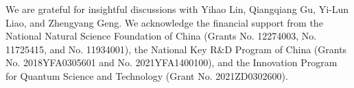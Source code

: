 \documentclass[%
reprint,
superscriptaddress,
bibnotes,
amsmath,amssymb,
aps,
floatfix, %
]{revtex4-2}
\begin{document}
\begin{acknowledgments}
\noindent We are grateful for insightful discussions with Yihao Lin, Qiangqiang Gu, Yi-Lun Liao, and Zhengyang Geng. We acknowledge the ﬁnancial support from the National Natural Science Foundation of China (Grants No. 12274003, No. 11725415, and No. 11934001), the National Key R\&D Program of China (Grants No. 2018YFA0305601 and No. 2021YFA1400100), and the Innovation Program for Quantum Science and Technology (Grant No. 2021ZD0302600).
\end{acknowledgments}




\end{document}
